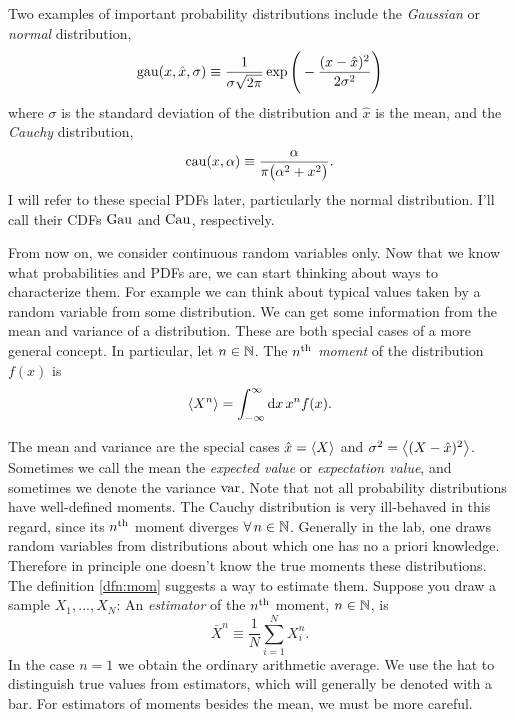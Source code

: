 \begin{example*}{}{}
Two examples of important probability distributions include the {\it Gaussian}
or {\it normal} distribution,
\begin{equation}
  \operatorname{gau}(x,\hat{x},\sigma)\equiv\frac{1}{\sigma\sqrt{2\pi}}
  \exp\Bigg(-\frac{(x-\hat{x})^2}{2\sigma^2}\Bigg)
\end{equation}
where $\sigma$ is the standard deviation of the distribution and $\hat{x}$ is
the mean, and the {\it Cauchy}  distribution,
\begin{equation}
  \operatorname{cau}(x,\alpha)\equiv\frac{\alpha}{\pi\big(\alpha^2+x^2\big)}.
\end{equation}
I will refer to these special PDFs later, particularly the normal distribution.
I'll call their CDFs $\operatorname{Gau}$ and $\operatorname{Cau}$, respectively.
\end{example*}

From now on, we consider continuous random variables only.
Now that we know what probabilities and PDFs are, we can start thinking about
ways to characterize them. For example we can think about typical values taken
by a random variable from some distribution. We can get some information
from the mean and variance of a distribution. These are
both special cases of a more general concept.
In particular, let $n\in\mathbb{N}$.
  The {\it $n{}^{\rm th}$ moment} of the distribution $f(x)$ is
  \begin{equation}\label{dfn:mom}
    \ev{X^n}=\int_{-\infty}^\infty\dd{x}x^nf(x).
  \end{equation}

The mean and variance are the special cases $\hat{x}=\ev{X}$ and
$\sigma^2=\ev{(X-\hat{x})^2}$. Sometimes we call the mean the {\it expected
value} or {\it expectation value}, and sometimes we denote the variance $\operatorname{var}$. Note that not all
probability distributions have well-defined moments. The Cauchy distribution is
very ill-behaved in this regard, since its $n{}^{\rm th}$ moment diverges
$\operatorname{\forall} n\in\mathbb{N}$.
Generally in the lab, one draws random variables from distributions
about which one has no a priori knowledge. Therefore in principle one
doesn't know the true moments these distributions. The
definition \eqref{dfn:mom} suggests a way to estimate them.
Suppose you draw a sample $X_1,...,X_N$:
  An {\it estimator} of the $n{}^{\rm th}$ moment, $n\in\mathbb{N}$, is
  \begin{equation}
    \bar{X}^n\equiv\frac{1}{N}\sum_{i=1}^N X_i^n.
  \end{equation}
In the case $n=1$ we obtain the ordinary arithmetic average.
We use the hat to distinguish true values from estimators, which will
generally be denoted with a bar. For estimators of moments besides the
mean, we must be more careful.

